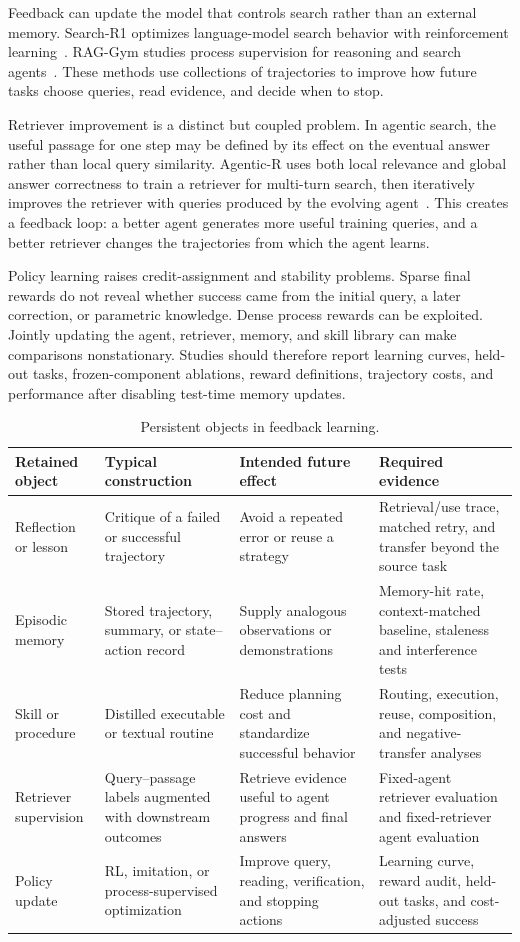 Feedback can update the model that controls search rather than an external memory. Search-R1 optimizes language-model search behavior with reinforcement learning~\cite{jin2025searchr1}. RAG-Gym studies process supervision for reasoning and search agents~\cite{xiong2025raggym}. These methods use collections of trajectories to improve how future tasks choose queries, read evidence, and decide when to stop.

Retriever improvement is a distinct but coupled problem. In agentic search, the useful passage for one step may be defined by its effect on the eventual answer rather than local query similarity. Agentic-R uses both local relevance and global answer correctness to train a retriever for multi-turn search, then iteratively improves the retriever with queries produced by the evolving agent~\cite{liu2026agenticr}. This creates a feedback loop: a better agent generates more useful training queries, and a better retriever changes the trajectories from which the agent learns.

Policy learning raises credit-assignment and stability problems. Sparse final rewards do not reveal whether success came from the initial query, a later correction, or parametric knowledge. Dense process rewards can be exploited. Jointly updating the agent, retriever, memory, and skill library can make comparisons nonstationary. Studies should therefore report learning curves, held-out tasks, frozen-component ablations, reward definitions, trajectory costs, and performance after disabling test-time memory updates.

\begin{table}[tbp]
\centering
\caption{Persistent objects in feedback learning.}
\label{tab:feedback_objects}
\small
\begin{tabularx}{\textwidth}{@{}p{2.6cm}p{3.1cm}Y Y@{}}
\toprule
Retained object & Typical construction & Intended future effect & Required evidence \\
\midrule
Reflection or lesson & Critique of a failed or successful trajectory & Avoid a repeated error or reuse a strategy & Retrieval/use trace, matched retry, and transfer beyond the source task \\
Episodic memory & Stored trajectory, summary, or state--action record & Supply analogous observations or demonstrations & Memory-hit rate, context-matched baseline, staleness and interference tests \\
Skill or procedure & Distilled executable or textual routine & Reduce planning cost and standardize successful behavior & Routing, execution, reuse, composition, and negative-transfer analyses \\
Retriever supervision & Query--passage labels augmented with downstream outcomes & Retrieve evidence useful to agent progress and final answers & Fixed-agent retriever evaluation and fixed-retriever agent evaluation \\
Policy update & RL, imitation, or process-supervised optimization & Improve query, reading, verification, and stopping actions & Learning curve, reward audit, held-out tasks, and cost-adjusted success \\
\bottomrule
\end{tabularx}
\end{table}


